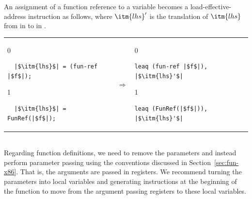 \documentclass[7x10,nocrop]{TimesAPriori_MIT}%
\def\racketEd{0}
\def\pythonEd{1}
\def\edition{1}
\begin{document}
An assignment of a function reference to a variable becomes a
load-effective-address instruction as follows, where $\itm{lhs}'$
is the translation of $\itm{lhs}$ from \Atm{} in \LangCFun{}
to \Arg{} in \LangXIndCallVar{}. \\
\begin{tabular}{lcl}
\begin{minipage}{0.35\textwidth}
{\if\edition\racketEd
\begin{lstlisting}
  |$\itm{lhs}$| = (fun-ref |$f$|);
\end{lstlisting}
\fi}
{\if\edition\pythonEd
\begin{lstlisting}
  |$\itm{lhs}$| = FunRef(|$f$|);
\end{lstlisting}
\fi}
\end{minipage}
&
$\Rightarrow$\qquad\qquad
&
\begin{minipage}{0.3\textwidth}
{\if\edition\racketEd
\begin{lstlisting}
leaq (fun-ref |$f$|), |$\itm{lhs}'$|
\end{lstlisting}
\fi}
{\if\edition\pythonEd
\begin{lstlisting}
leaq (FunRef(|$f$|)), |$\itm{lhs}'$|
\end{lstlisting}
\fi}
\end{minipage}
\end{tabular} \\

Regarding function definitions, we need to remove the parameters and
instead perform parameter passing using the conventions discussed in
Section~\ref{sec:fun-x86}. That is, the arguments are passed in
registers. We recommend turning the parameters into local variables
and generating instructions at the beginning of the function to move
from the argument passing registers to these local variables.
\end{document}
